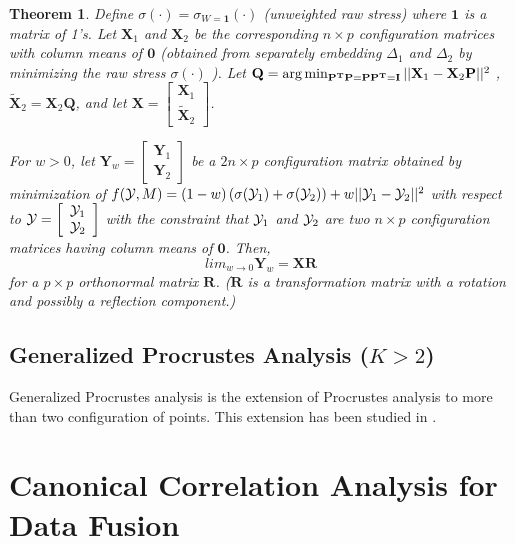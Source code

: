\documentclass[12pt,oneside,final]{thesis}\usepackage[]{graphicx}\usepackage[]{color}
\newtheorem{thm}{Theorem}
\begin{document}
\begin{thm}
Define $\sigma(\cdot)=\sigma_{W=\bm{1}}(\cdot)$ (unweighted raw stress) where $\bm{1}$ is a matrix of 1's.
 Let $\mathbf{X}_1$ and $\mathbf{X}_2$ be the corresponding $n\times p$ configuration matrices with column means of $\bm{0}$ (obtained from separately embedding  $\Delta_1$ and $\Delta_2$ by minimizing the raw stress $\sigma(\cdot)$ ). 
Let  $\mathbf{Q}=\arg\min_{\mathbf{P^T}\mathbf{P}=\mathbf{P}\mathbf{P^T}=\mathbf{I}}||{\mathbf{X}_1-\mathbf{X}_2}\mathbf{P}||^2$ ,   $\mathbf{\tilde{X}}_2= \mathbf{X}_2\mathbf{Q}$, 
and let  
$\mathbf{X}=\left[\begin{array}{c}
\mathbf{X}_1\\
\mathbf{\tilde{X}}_2
\end{array}\right]$.

For $w>0$, let $\mathbf{Y}_{w} = \left[\begin{array}{c}
\mathbf{Y}_1\\
\mathbf{Y}_2
\end{array}\right]$  be  a $2n \times p$ configuration matrix obtained by minimization of 
$ f(\mathcal{Y}, M) =(1-w)\left({\sigma{(\mathcal{Y}_1)}}+{\sigma{(\mathcal{Y}_2)}}\right)+w||{\mathcal{Y}_1-\mathcal{Y}_2}||^2 $ with respect to  $\mathcal{Y}=\left[\begin{array}{c}
\mathcal{Y}_1\\
\mathcal{Y}_2
\end{array}\right]$ with the constraint that $\mathcal{Y}_1$ and $\mathcal{Y}_2$ are two $n \times p$ configuration matrices having column means of $\bm{0}$. Then, $$lim_{w\rightarrow0}\mathbf{Y}_{w}=\mathbf{X}\mathbf{R}$$ for a $p\times p$ orthonormal matrix $\mathbf{R}$. ($\mathbf{R}$ is a transformation matrix with a rotation and possibly a reflection component.)
\end{thm}
 
\section{Generalized Procrustes Analysis ($K>2$)}
Generalized Procrustes analysis is the extension of Procrustes analysis to more than two configuration of points. This extension has been studied in \cite{GPCA}.






\chapter{Canonical Correlation Analysis for Data Fusion}
\label{sec:CCA}
\end{document}
